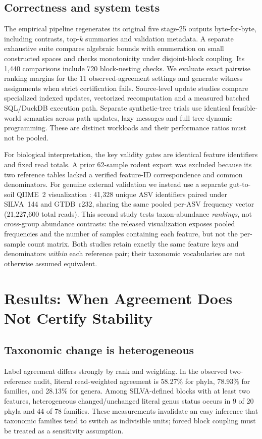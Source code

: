 \documentclass[conference]{IEEEtran}
\begin{document}
\subsection{Correctness and system tests}
The empirical pipeline regenerates its original five stage-25 outputs byte-for-byte, including contrasts, top-$k$ summaries and validation metadata. A separate exhaustive suite compares algebraic bounds with enumeration on small constructed spaces and checks monotonicity under disjoint-block coupling. Its 1,440 comparisons include 720 block-nesting checks. We evaluate exact pairwise ranking margins for the 11 observed-agreement settings and generate witness assignments when strict certification fails. Source-level update studies compare specialized indexed updates, vectorized recomputation and a measured batched SQL/DuckDB execution path. Separate synthetic-tree trials use identical feasible-world semantics across path updates, lazy messages and full tree dynamic programming. These are distinct workloads and their performance ratios must not be pooled.

For biological interpretation, the key validity gates are identical feature identifiers and fixed read totals. A prior 62-sample rodent export was excluded because its two reference tables lacked a verified feature-ID correspondence and common denominators. For genuine external validation we instead use a separate gut-to-soil QIIME~2 visualization \cite{caporaso2026dual,meilander2024data}: 41,328 unique ASV identifiers paired under SILVA~144 and GTDB~r232, sharing the same pooled per-ASV frequency vector (21,227,600 total reads). This second study tests taxon-abundance \emph{rankings}, not cross-group abundance contrasts: the released visualization exposes pooled frequencies and the number of samples containing each feature, but not the per-sample count matrix. Both studies retain exactly the same feature keys and denominators \emph{within} each reference pair; their taxonomic vocabularies are not otherwise assumed equivalent.

\section{Results: When Agreement Does Not Certify Stability}
\label{sec:results}
\subsection{Taxonomic change is heterogeneous}
Label agreement differs strongly by rank and weighting. In the observed two-reference audit, literal read-weighted agreement is 58.27\% for phyla, 78.93\% for families, and 28.13\% for genera. Among SILVA-defined blocks with at least two features, heterogeneous changed/unchanged literal genus status occurs in 9 of 20 phyla and 44 of 78 families. These measurements invalidate an easy inference that taxonomic families tend to switch as indivisible units; forced block coupling must be treated as a sensitivity assumption.
\end{document}
